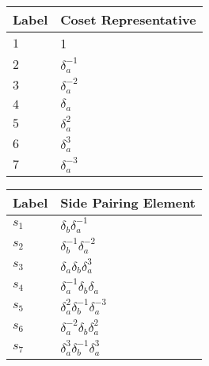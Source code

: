 \documentclass{article}
\begin{document}
\begin{center}
\begin{tabular}{ll}
\toprule
Label & Coset Representative\\
\midrule
$1$ & 1 \\
$2$ & $\delta_a^{-1}$ \\
$3$ & $\delta_a^{-2}$ \\
$4$ & $\delta_a^{}$ \\
$5$ & $\delta_a^{2}$ \\
$6$ & $\delta_a^{3}$ \\
$7$ & $\delta_a^{-3}$ \\
\bottomrule
\end{tabular}
\hfill
\begin{tabular}{ll}
\toprule
Label & Side Pairing Element\\
\midrule
$s_{1}$ & $\delta_b^{}\delta_a^{-1}$ \\
$s_{2}$ & $\delta_b^{-1}\delta_a^{-2}$ \\
$s_{3}$ & $\delta_a^{}\delta_b^{}\delta_a^{3}$ \\
$s_{4}$ & $\delta_a^{-1}\delta_b^{}\delta_a^{}$ \\
$s_{5}$ & $\delta_a^{2}\delta_b^{-1}\delta_a^{-3}$ \\
$s_{6}$ & $\delta_a^{-2}\delta_b^{}\delta_a^{2}$ \\
$s_{7}$ & $\delta_a^{3}\delta_b^{-1}\delta_a^{3}$ \\
\bottomrule
\end{tabular}
\end{center}

\thispagestyle{empty}
\end{document}

